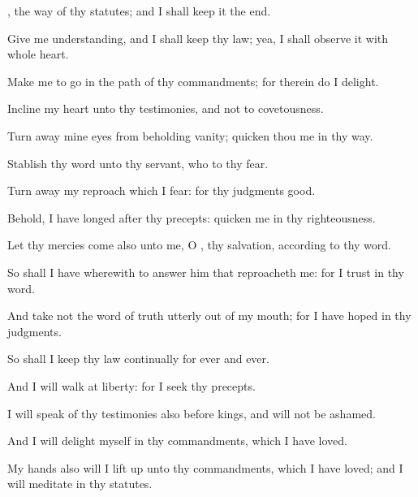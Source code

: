 {{}, the
way of thy
statutes; and I shall
keep it
{} the
end.
\par }{\Q {}Give me
understanding, and I shall
keep thy
law; yea, I shall
observe it with
{} whole
heart.
\par }{\BB \par }{\Q {}Make me to
go in the
path of thy
commandments; for therein do I
delight.
\par }{\Q {}Incline my
heart unto thy
testimonies, and not to
covetousness.
\par }{\Q {}Turn
away mine
eyes from
beholding
vanity;
{}
quicken thou me in thy
way.
\par }{\Q {}Stablish thy
word unto thy
servant, who
{} to thy
fear.
\par }{\Q {}Turn
away my
reproach which I
fear: for thy
judgments
{}
good.
\par }{\Q {}Behold, I have
longed after thy
precepts:
quicken me in thy
righteousness.
\par }{\BB \par }{
\par }{\Q {}Let thy
mercies
come also unto me, O
{},
{} thy
salvation, according to thy
word.
\par }{\Q {}So shall I have
wherewith to
answer him that
reproacheth me: for I
trust in thy
word.
\par }{\BB \par }{\Q {}And
take not the
word of
truth
utterly out of my
mouth; for I have
hoped in thy
judgments.
\par }{\Q {}So shall I
keep thy
law
continually for
ever and
ever.
\par }{\BB \par }{\Q {}And I will
walk at
liberty: for I
seek thy
precepts.
\par }{\Q {}I will
speak of thy
testimonies also before
kings, and will not be
ashamed.
\par }{\Q {}And I will
delight myself in thy
commandments, which I have
loved.
\par }{\Q {}My
hands also will I lift
up unto thy
commandments, which I have
loved; and I will
meditate in thy
statutes.
\par }{
}
